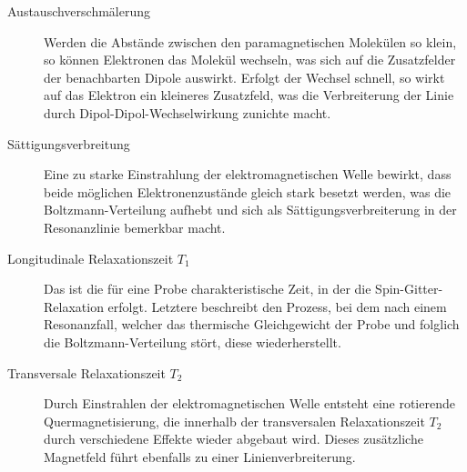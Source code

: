 \documentclass[a4paper,titlepage]{scrartcl}
\numberwithin{equation}{section}
\begin{document}
\begin{description}
\item[Austauschverschmälerung] Werden die Abstände zwischen den paramagnetischen Molekülen so klein, so können Elektronen das Molekül wechseln, was sich auf die Zusatzfelder der benachbarten Dipole auswirkt. Erfolgt der Wechsel schnell, so wirkt auf das Elektron ein kleineres Zusatzfeld, was die Verbreiterung der Linie durch Dipol-Dipol-Wechselwirkung zunichte macht.
\item[Sättigungsverbreitung] Eine zu starke Einstrahlung der elektromagnetischen Welle bewirkt, dass beide möglichen Elektronenzustände gleich stark besetzt werden, was die Boltzmann-Verteilung aufhebt und sich als Sättigungsverbreiterung in der Resonanzlinie bemerkbar macht.
\item[Longitudinale Relaxationszeit $T_1$] Das ist die für eine Probe charakteristische Zeit, in der die Spin-Gitter-Relaxation erfolgt. Letztere beschreibt den Prozess, bei dem nach einem Resonanzfall, welcher das thermische Gleichgewicht der Probe und folglich die Boltzmann-Verteilung stört, diese wiederherstellt.
\item[Transversale Relaxationszeit $T_2$] Durch Einstrahlen der elektromagnetischen Welle entsteht eine rotierende Quermagnetisierung, die innerhalb der transversalen Relaxationszeit $T_2$ durch verschiedene Effekte wieder abgebaut wird. Dieses zusätzliche Magnetfeld führt ebenfalls zu einer Linienverbreiterung.
\end{description}
\end{document}
